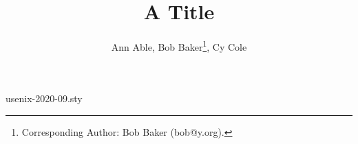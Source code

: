 \begin{filecontents*}[overwrite]{usenix-2020-09.sty}
\def\maketitle{\par
 \begingroup
   \renewcommand\thefootnote{\fnsymbol{footnote}}%
   \def\@makefnmark{\hbox to\z@{$\m@th^{\@thefnmark}$\hss}}%
   \if@twocolumn
     \twocolumn[\@maketitle]%
     \else \newpage
     \global\@topnum\z@
     \@maketitle \fi\@thanks
 \endgroup
 \setcounter{footnote}{0}%
 \let\maketitle\relax
 \let\@maketitle\relax
 \gdef\@thanks{}\gdef\@author{}\gdef\@title{}\let\thanks\relax}
\def\@maketitle{\newpage\begin{center}{\Large\bf \@title \par}\vskip 0.375in
  {\large\it\begin{tabular}[t]{c}\@author\end{tabular}\par}\end{center}\par}
\def\abstract{\begin{center}%
{\large\bf \abstractname\vspace{-.5em}\vspace{\z@}}%
\end{center}}
\def\endabstract{}
\end{filecontents*}
\documentclass[twocolumn]{article}
\usepackage{usenix-2020-09}
\usepackage[english]{babel}
\title{A Title}
\author{Ann Able, Bob Baker\thanks{Corresponding Author: Bob Baker (bob@y.org).}, Cy Cole}

\maketitle
\begin{abstract}
An abstract.
\end{abstract}
Body.

